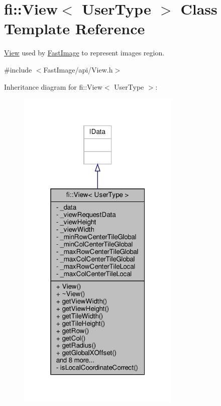 \hypertarget{classfi_1_1View}{}\section{fi\+:\+:View$<$ User\+Type $>$ Class Template Reference}
\label{classfi_1_1View}


\hyperlink{classfi_1_1View}{View} used by \hyperlink{classfi_1_1FastImage}{Fast\+Image} to represent image\textquotesingle{}s region.  




{\ttfamily \#include $<$Fast\+Image/api/\+View.\+h$>$}



Inheritance diagram for fi\+:\+:View$<$ User\+Type $>$\+:
\nopagebreak
\begin{figure}[H]
\begin{center}
\leavevmode
\includegraphics[width=220pt]{d9/d7e/classfi_1_1View__inherit__graph}
\end{center}
\end{figure}


